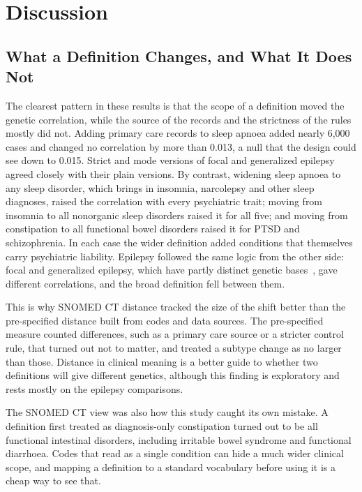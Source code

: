 \documentclass[conference]{IEEEtran}
\begin{document}
\section{Discussion}

\subsection{What a Definition Changes, and What It Does Not}
The clearest pattern in these results is that the scope of a definition moved the genetic correlation, while the source of the records and the strictness of the rules mostly did not. Adding primary care records to sleep apnoea added nearly 6,000 cases and changed no correlation by more than 0.013, a null that the design could see down to 0.015. Strict and mode versions of focal and generalized epilepsy agreed closely with their plain versions. By contrast, widening sleep apnoea to any sleep disorder, which brings in insomnia, narcolepsy and other sleep diagnoses, raised the correlation with every psychiatric trait; moving from insomnia to all nonorganic sleep disorders raised it for all five; and moving from constipation to all functional bowel disorders raised it for PTSD and schizophrenia. In each case the wider definition added conditions that themselves carry psychiatric liability. Epilepsy followed the same logic from the other side: focal and generalized epilepsy, which have partly distinct genetic bases~\cite{ilae2018}, gave different correlations, and the broad definition fell between them.

This is why SNOMED CT distance tracked the size of the shift better than the pre-specified distance built from codes and data sources. The pre-specified measure counted differences, such as a primary care source or a stricter control rule, that turned out not to matter, and treated a subtype change as no larger than those. Distance in clinical meaning is a better guide to whether two definitions will give different genetics, although this finding is exploratory and rests mostly on the epilepsy comparisons.

The SNOMED CT view was also how this study caught its own mistake. A definition first treated as diagnosis-only constipation turned out to be all functional intestinal disorders, including irritable bowel syndrome and functional diarrhoea. Codes that read as a single condition can hide a much wider clinical scope, and mapping a definition to a standard vocabulary before using it is a cheap way to see that.
\end{document}
